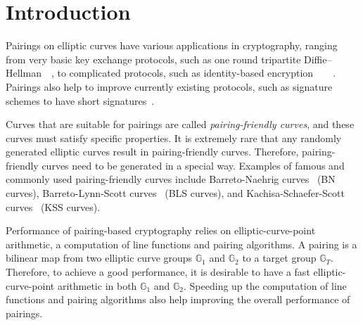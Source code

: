 %
%
%
%
%
%
%
%
%
%

\section{Introduction}

Pairings on elliptic curves have various applications in cryptography,
ranging from very basic key exchange protocols,
such as one round tripartite Diffie--Hellman~\cite{2000/joux-ants}~\cite{2004/joux-tripartite},
to complicated protocols, such as
identity-based encryption~\cite{2001/boneh}~\cite{2002/horwitz}~\cite{2002/gentry}~\cite{2005/sahai}.
Pairings also help to improve currently existing protocols, 
such as signature schemes to have short signatures~\cite{2004/boneh}.

Curves that are suitable for pairings are called {\emph{pairing-friendly curves}},
and these curves must satisfy specific properties.
It is extremely rare that any randomly generated elliptic curves result in pairing-friendly curves.
Therefore, pairing-friendly curves need to be generated in a special way.
Examples of famous and commonly used pairing-friendly curves include 
Barreto-Naehrig curves~\cite{2006/barreto} (BN curves),
Barreto-Lynn-Scott curves~\cite{2003/bls} (BLS curves), and
Kachisa-Schaefer-Scott curves~\cite{2008/kss} (KSS curves).

Performance of pairing-based cryptography relies on
elliptic-curve-point arithmetic, a computation of line functions and pairing algorithms.
A pairing is a bilinear map from two elliptic curve groups $\mathbb{G}_1$ and $\mathbb{G}_2$ to
a target group $\mathbb{G}_T$.
Therefore, to achieve a good performance,
it is desirable to have a fast elliptic-curve-point arithmetic in both $\mathbb{G}_1$ and $\mathbb{G}_2$.
Speeding up the computation of line functions and pairing algorithms also help improving the overall performance of pairings.

